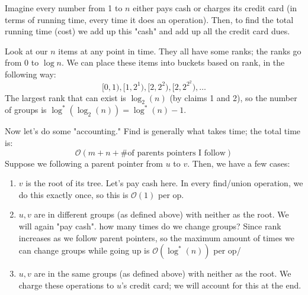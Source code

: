 \begin{algothm}
    \begin{proof*}
        Imagine every number from 1 to $n$ either pays cash or charges its credit card (in terms of running time, every time it does an operation). Then,
        to find the total running time (cost) we add up this "cash" and add up all the credit card dues.

        Look at our $n$ items at any point in time. They all have some ranks; the ranks go from 0
        to $\log n$. We can place these items into buckets based on rank, in the following way:
        \[ [0, 1), [1, 2^1), [2, 2^{2}), [2, 2^{2^2}), \dots \]
        The largest rank that can exist is $\log_2(n)$ (by claims 1 and 2), so the number of groups is
        $\log^*(\log_2(n)) = \log^*(n) - 1$.

        Now let's do some "accounting." Find is generally what takes time; the total time is:
        \[ \mathcal{O}(m + n + \text{\# of parents pointers I follow}) \]
        Suppose we following a parent pointer from $u$ to $v$. Then, we have a few cases:
        \begin{enumerate}
            \item $v$ is the root of its tree. Let's pay cash here. In every find/union operation, we do this exactly once, so this is $\mathcal{O}(1)$ per op.
            \item $u, v$ are in different groups (as defined above) with neither as the root. We will again "pay cash".
            how many times do we change groups? Since rank increases as we follow parent pointers,
            so the maximum amount of times we can change groups while going up is $\mathcal{O}(\log^*(n))$ per op/
            \item $u, v$ are in the same groups (as defined above) with neither as the root. We charge these operations to $u$'s credit card; we will account for this at the end.
        \end{enumerate}
    \end{proof*}
\end{algothm}